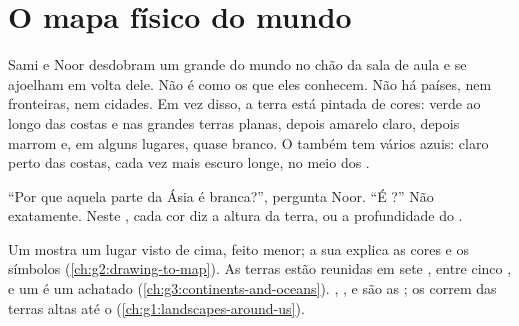 \chapter{O mapa físico do mundo}\label{ch:g4:world-physical-map}

Sami e Noor desdobram um grande  do mundo no chão da sala de aula e se
ajoelham em volta dele. Não é como os  que eles conhecem. Não há
países, nem fronteiras, nem cidades. Em vez disso, a terra está pintada de
cores: verde ao longo das costas e nas grandes terras planas, depois amarelo
claro, depois marrom e, em alguns lugares, quase branco. O  também tem
vários azuis: claro perto das costas, cada vez mais escuro longe, no meio
dos .

``Por que aquela parte da Ásia é branca?'', pergunta Noor. ``É ?'' Não
exatamente. Neste , cada cor diz a altura da terra, ou a profundidade do .

\begin{recall}
Um  mostra um lugar visto de cima, feito menor; a sua  explica
as cores e os símbolos (\cref{ch:g2:drawing-to-map}). As terras estão
reunidas em sete , entre cinco , e um  é um
 achatado (\cref{ch:g3:continents-and-oceans}). , ,
 e  são as ; os  correm das terras altas
até o  (\cref{ch:g1:landscapes-around-us}).
\end{recall}

